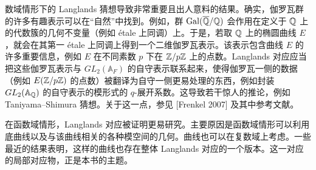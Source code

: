 数域情形下的 Langlands 猜想导致非常重要且出人意料的结果。确实，伽罗瓦群的许多有趣表示可以在“自然”中找到。例如，群 $\operatorname{Gal}(\overline{\mathbb{Q}}/\mathbb{Q})$ 会作用在定义于 $\mathbb{Q}$ 上的代数簇的几何不变量（例如 étale 上同调）上。于是，若取 $\mathbb{Q}$ 上的椭圆曲线 $E$，就会在其第一 étale 上同调上得到一个二维伽罗瓦表示。该表示包含曲线 $E$ 的许多重要信息，例如 $E$ 在不同素数 $p$ 下在 $\mathbb{Z}/p\mathbb{Z}$ 上的点数。Langlands 对应应当把这些伽罗瓦表示与 $GL_2(\mathbb{A}_F)$ 的自守表示联系起来，使得伽罗瓦一侧的数据（例如 $E(\mathbb{Z}/p\mathbb{Z})$ 的点数）被翻译为自守一侧更易处理的东西，例如封装 $GL_2(\mathbb{A}_{\mathbb{Q}})$ 的自守表示的模形式的 $q$-展开系数。这导致若干惊人的推论，例如 Taniyama--Shimura 猜想。关于这一点，参见 [Frenkel 2007] 及其中参考文献。


在函数域情形，Langlands 对应被证明更易研究。主要原因是函数域情形可以利用底曲线以及与该曲线相关的各种模空间的几何。曲线也可以在复数域上考虑。一些最近的结果表明，这样的曲线也存在整体 Langlands 对应的一个版本。这一对应的局部对应物，正是本书的主题。


